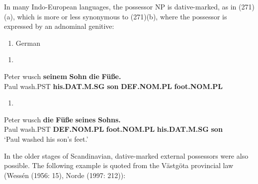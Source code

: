 In many Indo-European languages, the possessor NP is dative-marked, as in (271)(a), which is more or less synonymous to (271)(b), where the possessor is expressed by an adnominal genitive:

\begin{enumerate} %
\item 
\label{bkm:Ref95294441}German

\end{enumerate} %
\setcounter{listLFOxcviiileveli}{0}
\begin{enumerate} %
\item 
\end{enumerate} %
\ea\label{}
\gll Peter  wusch  \textbf{seinem}\textbf{  Sohn}\textbf{  die}\textbf{  Füße.}\\


Paul  wash.PST  \textbf{his.DAT.M.SG}\textbf{  son}\textbf{  DEF.NOM.PL}\textbf{  foot.NOM.PL}\\ %


\begin{enumerate} %
\item 
\end{enumerate} %
\ea\label{}
\gll Peter  wusch  \textbf{die}\textbf{  Füße}\textbf{  seines}\textbf{  Sohns.}\\


Paul  wash.PST  \textbf{DEF.NOM.PL}\textbf{  foot.NOM.PL}\textbf{  his.DAT.M.SG}\textbf{  son}\\ %


‘Paul washed his son’s feet.’
\z


In the older stages of Scandinavian, dative-marked external possessors were also possible. The following example is quoted from the Västgöta provincial law (Wessén (1956: 15), Norde (1997: 212)): 

